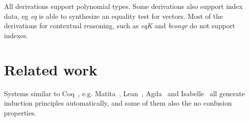 \documentclass[a4paper,UKenglish,cleveref, autoref]{lipics-v2019}
\newcommand{\derive}[1]{\emph{#1}}
\begin{document}
All derivations support polynomial types.
Some derivations also support index data, eg \derive{eq} is able to
synthesize an equality test for vectors. Most of the derivations for
contextual reasoning, such as \derive{eqK} and \derive{bcongr} do not
support indexes.
% 
% 
% 

\section{Related work} %
\label{sec:related}

Systems similar to Coq~\cite{the_coq_development_team_2018_1219885},
e.g. Matita~\cite{10.1007/978-3-642-22438-6_7},
Lean~\cite{10.1007/978-3-319-21401-6_26}, Agda~\cite{norell:thesis} and
Isabelle~\cite{Nipkow:2002:IPA:1791547} all generate
induction principles automatically, and some of them also the
no confusion properties. 
\end{document}
